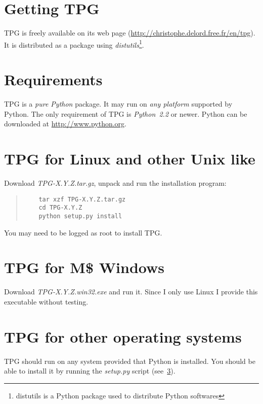 
\section{Getting TPG}

TPG is freely available on its web page (\url{http://christophe.delord.free.fr/en/tpg}). It is distributed as a package using \emph{distutils}\footnote{distutils is a Python package used to distribute Python softwares}.

\section{Requirements}

TPG is a \emph{pure Python} package.
It may run on \emph{any platform} supported by Python.
The only requirement of TPG is \emph{Python~2.2} or newer. Python can be downloaded at \url{http://www.python.org}.

\section{TPG for Linux and other Unix like}                 \label{linux_install}

Download \mbox{\emph{TPG-X.Y.Z.tar.gz}}, unpack and run the installation program:
\begin{quote}
\begin{verbatim}
    tar xzf TPG-X.Y.Z.tar.gz
    cd TPG-X.Y.Z
    python setup.py install
\end{verbatim}
\end{quote}
You may need to be logged as root to install TPG.

\section{TPG for M\$ Windows}

Download \mbox{\emph{TPG-X.Y.Z.win32.exe}} and run it.
Since I only use Linux I provide this executable without testing.

\section{TPG for other operating systems}

TPG should run on any system provided that Python is installed. You should be able to install it by running the \mbox{\emph{setup.py}} script (see~\ref{linux_install}).
